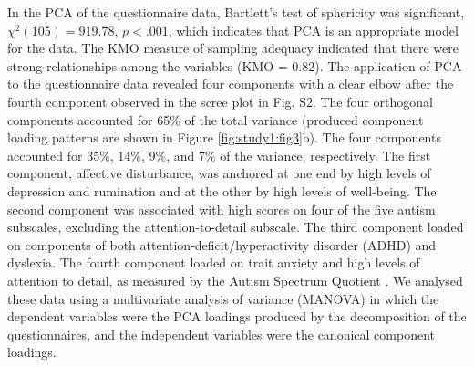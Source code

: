 In the PCA of the questionnaire data, Bartlett’s test of sphericity was significant,
\(\chi^{2}(105) = 919.78\),
\(\mathit{p} < .001\),
which indicates that PCA is an appropriate model for the data. The KMO measure of sampling adequacy indicated that there were strong relationships among the variables (KMO = 0.82). The application of PCA to the questionnaire data revealed four components with a clear elbow after the fourth component observed in the scree plot in Fig. S2. The four orthogonal components accounted for 65\% of the total variance (produced component loading patterns are shown in Figure \ref{fig:study1:fig3}b). The four components accounted for 35\%, 14\%, 9\%, and 7\% of the variance, respectively. The first component, affective disturbance, was anchored at one end by high levels of depression and rumination and at the other by high levels of well-being. The second component was associated with high scores on four of the five autism subscales, excluding the attention-to-detail subscale. The third component loaded on components of both attention-deficit/hyperactivity disorder (ADHD) and dyslexia. The fourth component loaded on trait anxiety and high levels of attention to detail, as measured by the Autism Spectrum Quotient \cite{Baron-Cohen2001}. We analysed these data using a multivariate analysis of variance (MANOVA) in which the dependent variables were the PCA loadings produced by the decomposition of the questionnaires, and the independent variables were the canonical component loadings.
